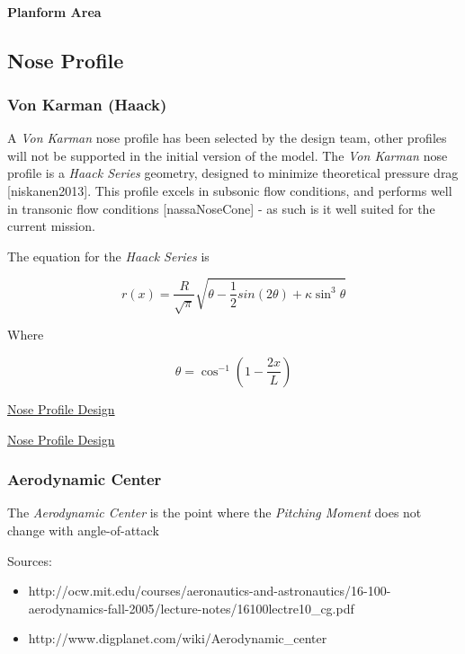 \documentclass[]{article}
\providecommand{\tightlist}{%
  \setlength{\itemsep}{0pt}\setlength{\parskip}{0pt}}
\let\oldparagraph\paragraph
\renewcommand{\paragraph}[1]{\oldparagraph{#1}\mbox{}}
\begin{document}
\paragraph{Planform Area}\label{planform-area}

\subsection{Nose Profile}\label{nose-profile}

\subsubsection{Von Karman (Haack)}\label{von-karman-haack}

A \emph{Von Karman} nose profile has been selected by the design team,
other profiles will not be supported in the initial version of the
model. The \emph{Von Karman} nose profile is a \emph{Haack Series}
geometry, designed to minimize theoretical pressure drag
{[}niskanen2013{]}. This profile excels in subsonic flow conditions, and
performs well in transonic flow conditions {[}nassaNoseCone{]} - as such
is it well suited for the current mission.

The equation for the \emph{Haack Series} is

\begin{equation}
r(x) = \dfrac{R}{\sqrt{\pi}} \sqrt{ \theta - \dfrac{1}{2} sin (2 \theta) + \kappa \sin^3 \theta }
\end{equation}

Where

\begin{equation}
\theta = \cos^{-1} \left( 1 - \dfrac{2x}{L} \right)
\end{equation}

\href{http://rimworld.com/nassarocketry/fabrication/nosecones/design.html}{Nose
Profile Design}

\href{https://en.wikipedia.org/wiki/Nose_cone_design\#Von_K.C3.A1rm.C3.A1n}{Nose
Profile Design}

\subsubsection{Aerodynamic Center}\label{aerodynamic-center}

The \emph{Aerodynamic Center} is the point where the \emph{Pitching
Moment} does not change with angle-of-attack

Sources:

\begin{itemize}
\tightlist
\item
  http://ocw.mit.edu/courses/aeronautics-and-astronautics/16-100-aerodynamics-fall-2005/lecture-notes/16100lectre10\_cg.pdf
\item
  http://www.digplanet.com/wiki/Aerodynamic\_center
\end{itemize}
\end{document}
